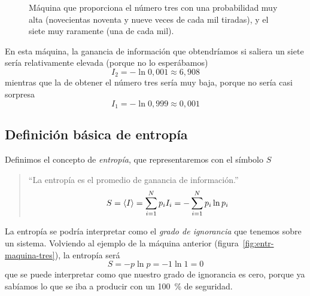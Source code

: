 \begin{figure}[ht]
  \caption{Máquina que proporciona el número tres con una probabilidad muy
    alta (novecientas noventa y nueve veces de cada mil tiradas), y el siete
    muy raramente (una de cada mil).}
  \label{fig:entr-maquina-tres-siete}
\end{figure}

En esta máquina, la ganancia de información que obtendríamos si saliera un
siete sería relativamente elevada (porque no lo esperábamos)
\[
  I_2 = -\ln 0,001 \approx 6,908
\]
mientras que la de obtener el número tres sería muy baja, porque no
sería casi sorpresa
\[
  I_1 = -\ln 0,999 \approx 0,001
\]

\subsection{Definición básica de entropía}
\label{subsect:entr-entropia-basica}
Definimos el concepto de \emph{entropía}, que representaremos con el símbolo
$S$
\begin{quote}
  ``La entropía es el promedio de ganancia de información.''
\begin{equation}\label{eq:entr-def-entropia-basica}
  S = \braket{I} = \sum_{i=1}^N p_i I_i = -\sum_{i=1}^N p_i \ln p_i
\end{equation}
\end{quote}
La entropía se podría interpretar como el \emph{grado de ignorancia} que
tenemos sobre un sistema. Volviendo al ejemplo de la máquina anterior
(figura~\ref{fig:entr-maquina-tres}), la entropía será
\[
  S = -p \ln p = -1 \ln 1 = 0
\]
que se puede interpretar como que nuestro grado de ignorancia es cero,
porque ya sabíamos lo que se iba a producir con un \SI{100}{\percent} de
seguridad.

